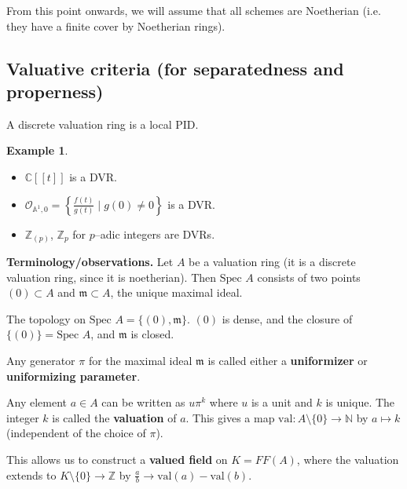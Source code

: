 \documentclass{article}
\theoremstyle{definition}
\newtheorem{example}{Example}[section]
\begin{document}
From this point onwards, we will assume that all schemes are Noetherian (i.e. they have a finite cover by Noetherian rings).

\subsection{Valuative criteria (for separatedness and properness)}
A discrete valuation ring is a local PID.
\begin{example}
    \begin{itemize}
        \item $\mathbb{C}[[t]]$ is a DVR.
        \item $\mathcal{O}_{\mathbb{A}^1,0} = \left\{\frac{f(t)}{g(t)} \mid g(0) \neq 0\right\}$ is a DVR.
        \item $\mathbb{Z}_{(p)}$, $\mathbb{Z}_p$ for $p$--adic integers are DVRs.
    \end{itemize}
\end{example}

\textbf{Terminology/observations.} Let $A$ be a valuation ring (it is a discrete valuation ring, since it is noetherian). Then $\text{Spec }A$ consists of two points $(0) \subset A$ and $\mathfrak{m} \subset A$, the unique maximal ideal.
\vspace{1mm}
 
The topology on $\text{Spec }A = \{(0), \mathfrak{m}\}$. $(0)$ is dense, and the closure of $\{(0)\} = \text{Spec }A$, and $\mathfrak{m}$ is closed.
\vspace{1mm}
 
Any generator $\pi$ for the maximal ideal $\mathfrak{m}$ is called either a \textbf{uniformizer} or \textbf{uniformizing parameter}.
\vspace{1mm}
 
Any element $a \in A$ can be written as $u \pi^k$ where $u$ is a unit and $k$ is unique. The integer $k$ is called the \textbf{valuation} of $a$. This gives a map $\text{val}: A\setminus \{0\} \to \mathbb{N}$ by $a \mapsto k$ (independent of the choice of $\pi$). 


This allows us to construct a \textbf{valued field} on $K = FF(A)$, where the valuation extends to $K\setminus \{0\} \to \mathbb{Z}$ by $\frac{a}{b} \to \text{val}(a)-\text{val}(b)$.
\end{document}
